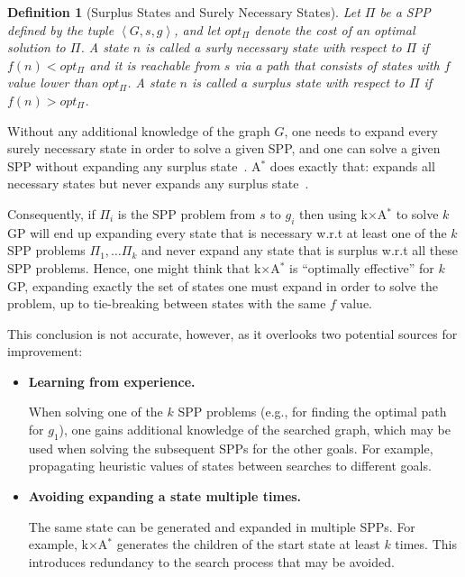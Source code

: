 \documentclass{aicom2e}
\newtheorem{definition}{Definition}
\newcommand{\kgs}{$k$GP}
\newcommand{\astar}{A$^*$}
\newcommand{\kxastar}{k$\times$A$^*$}
\newcommand{\tuple}[1]{\ensuremath{\left \langle #1 \right \rangle }}
\begin{document}
\begin{definition}[Surplus States and Surely Necessary States]
    Let $\Pi$ be a SPP defined by the tuple $\tuple{G,s,g}$, and let $opt_\Pi$ denote the cost of an optimal solution to $\Pi$.
    A state $n$ is called a {\em surly necessary} state with respect to $\Pi$ if $f(n)<opt_\Pi$
    and it is reachable from $s$ via a path that consists of states with $f$ value lower than $opt_\Pi$.
    A state $n$ is called a {\em surplus} state with respect to $\Pi$ if $f(n)>opt_\Pi$.
\label{def:surplus}
\end{definition}
Without any additional knowledge of the graph $G$, one needs to expand every surely necessary state in order to solve a given SPP,
and one can solve a given SPP without expanding any surplus state~\cite{dechter1985generalizedBestFirst,goldenberg2014enhanced}.
\astar{} does exactly that: expands all necessary states but never expands any surplus state~\cite{dechter1985generalizedBestFirst}.


Consequently, if $\Pi_i$ is the SPP problem from $s$ to $g_i$
then using \kxastar{} to solve \kgs{} will end up expanding every state that is necessary w.r.t at least one of the $k$ SPP problems $\Pi_1,\ldots \Pi_k$ and never expand any state that is surplus w.r.t all these SPP problems.
Hence, one might think that \kxastar{} is ``optimally effective'' for \kgs{},
expanding exactly the set of states one must expand in order to solve the problem, up to tie-breaking between states with the same $f$ value.


This conclusion is not accurate, however, as it overlooks two potential sources for improvement:
\begin{itemize}

\item {\bf Learning from experience.}

When solving one of the $k$ SPP problems (e.g., for finding the optimal path for $g_1$),
one gains additional knowledge of the searched graph, which may be used when solving the subsequent
SPPs for the other goals. For example, propagating heuristic values of states between searches to different goals.

\item {\bf Avoiding expanding a state multiple times.}

The same state can be generated and expanded in multiple SPPs. For example, \kxastar{}
generates the children of the start state at least $k$ times.
This introduces redundancy to the search process that may be avoided.
\end{itemize}
\end{document}
